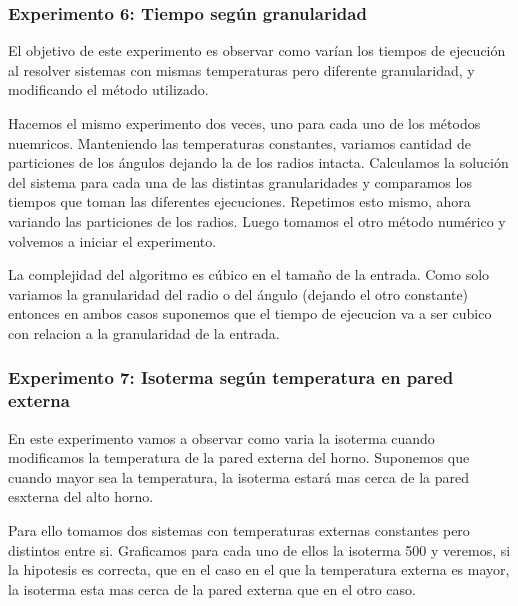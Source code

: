     \subsubsection*{Experimento 6: Tiempo según granularidad}
      El objetivo de este experimento es observar como varían los tiempos de ejecución al resolver sistemas con mismas temperaturas pero diferente granularidad, y modificando el método utilizado.
      
      Hacemos el mismo experimento dos veces, uno para cada uno de los métodos nuemricos. Manteniendo las temperaturas constantes, variamos cantidad de particiones de los ángulos dejando la de los radios intacta. Calculamos la solución del sistema para cada una de las distintas granularidades y comparamos los tiempos que toman las diferentes ejecuciones. Repetimos esto mismo, ahora variando las particiones de los radios. Luego tomamos el otro método numérico y volvemos a iniciar el experimento. 

      La complejidad del algoritmo es cúbico en el tamaño de la entrada. Como solo variamos la granularidad del radio o del ángulo (dejando el otro constante) entonces en ambos casos suponemos que el tiempo de ejecucion va a ser cubico con relacion a la granularidad de la entrada.

    \subsubsection*{Experimento 7: Isoterma según temperatura en pared externa}
      En este experimento vamos a observar como varia la isoterma cuando modificamos la temperatura de la pared externa del horno.
      Suponemos que cuando mayor sea la temperatura, la isoterma estará mas cerca de la pared esxterna del alto horno. 

      Para ello tomamos dos sistemas con temperaturas externas constantes pero distintos entre si. Graficamos para cada uno de ellos la isoterma 500 y veremos, si la hipotesis es correcta, que en el caso en el que la temperatura externa es mayor, la isoterma esta mas cerca de la pared externa que en el otro caso. 
